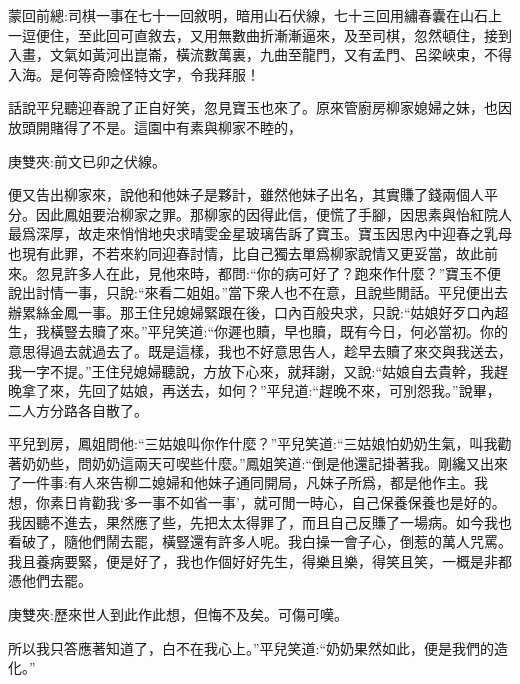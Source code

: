 

\begin{parag}
    \begin{note}蒙回前總:司棋一事在七十一回敘明，暗用山石伏線，七十三回用繡春囊在山石上一逗便住，至此回可直敘去，又用無數曲折漸漸逼來，及至司棋，忽然頓住，接到入畫，文氣如黃河出崑崙，橫流數萬裏，九曲至龍門，又有孟門、呂梁峽束，不得入海。是何等奇險怪特文字，令我拜服！\end{note}
\end{parag}


\begin{parag}
    話說平兒聽迎春說了正自好笑，忽見寶玉也來了。原來管廚房柳家媳婦之妹，也因放頭開賭得了不是。這園中有素與柳家不睦的，\begin{note}庚雙夾:前文已卯之伏線。\end{note}便又告出柳家來，說他和他妹子是夥計，雖然他妹子出名，其實賺了錢兩個人平分。因此鳳姐要治柳家之罪。那柳家的因得此信，便慌了手腳，因思素與怡紅院人最爲深厚，故走來悄悄地央求晴雯金星玻璃告訴了寶玉。寶玉因思內中迎春之乳母也現有此罪，不若來約同迎春討情，比自己獨去單爲柳家說情又更妥當，故此前來。忽見許多人在此，見他來時，都問:“你的病可好了？跑來作什麼？”寶玉不便說出討情一事，只說:“來看二姐姐。”當下衆人也不在意，且說些閒話。平兒便出去辦累絲金鳳一事。那王住兒媳婦緊跟在後，口內百般央求，只說:“姑娘好歹口內超生，我橫豎去贖了來。”平兒笑道:“你遲也贖，早也贖，既有今日，何必當初。你的意思得過去就過去了。既是這樣，我也不好意思告人，趁早去贖了來交與我送去，我一字不提。”王住兒媳婦聽說，方放下心來，就拜謝，又說:“姑娘自去貴幹，我趕晚拿了來，先回了姑娘，再送去，如何？”平兒道:“趕晚不來，可別怨我。”說畢，二人方分路各自散了。
\end{parag}


\begin{parag}
    平兒到房，鳳姐問他:“三姑娘叫你作什麼？”平兒笑道:“三姑娘怕奶奶生氣，叫我勸著奶奶些，問奶奶這兩天可喫些什麼。”鳳姐笑道:“倒是他還記掛著我。剛纔又出來了一件事:有人來告柳二媳婦和他妹子通同開局，凡妹子所爲，都是他作主。我想，你素日肯勸我‘多一事不如省一事’，就可閒一時心，自己保養保養也是好的。我因聽不進去，果然應了些，先把太太得罪了，而且自己反賺了一場病。如今我也看破了，隨他們鬧去罷，橫豎還有許多人呢。我白操一會子心，倒惹的萬人咒罵。我且養病要緊，便是好了，我也作個好好先生，得樂且樂，得笑且笑，一概是非都憑他們去罷。\begin{note}庚雙夾:歷來世人到此作此想，但悔不及矣。可傷可嘆。\end{note}所以我只答應著知道了，白不在我心上。”平兒笑道:“奶奶果然如此，便是我們的造化。”
\end{parag}


